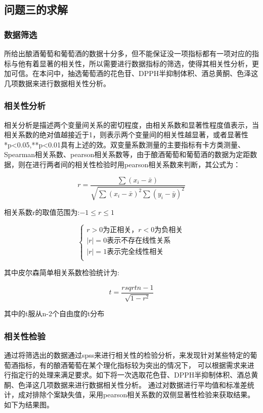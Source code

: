\documentclass[UTF8]{ctexart}
\begin{document}
\begin{itemize}
\end{itemize}


\subsection{问题三的求解}
\subsubsection{数据筛选}
所给出酿酒葡萄和葡萄酒的数据十分多，但不能保证没一项指标都有一项对应的指标与他有着显著的相关性，所以需要进行数据指标的筛选，使得其相关性分析，更加可信。在本问中，抽选葡萄酒的花色苷、DPPH半抑制体积、酒总黄酮、色泽这几项数据来进行数据相关性分析。

\subsubsection{相关性分析}

相关分析是描述两个变量间关系的密切程度，由相关系数和显著性程度值表示，当相关系数的绝对值越接近于1，则表示两个变量间的相关性越显著，或者显著性*p<0.05,**p<0.01具有上述的效。双变量系数测量的主要指标有卡方类测量、Spearman相关系数、pearson相关系数等，由于酿酒葡萄和葡萄酒的数据为定距数据，则在进行两者间的相关性检验时用pearson相关系数来判断，其公式为：

\begin{equation}
	r=\frac{\sum(x_i-\bar{x})}{\sqrt{\sum(x_i-\bar{x})^2 \sum(y_i-\bar{y})^2}}
\end{equation}

相关系数r的取值范围为:$-1\le r \le 1$

\[\left\{\begin{array}{llcl}
		r>0为正相关，r<0为负相关         \\

		\mid r \mid =0表示不存在线性关系 \\

		\mid r \mid =1表示完全线性相关   \\
	\end{array} \right.\]

其中皮尔森简单相关系数检验统计为:

\begin{equation}
	t=\frac{r sqrt{n-1}}{\sqrt{1-r^2}}
\end{equation}

其中的t服从n-2个自由度的t分布

\subsubsection{相关性检验}
通过将筛选出的数据通过spss来进行相关性的检验分析，来发现针对某些特定的葡萄酒指标，有的酿酒葡萄在某个理化指标较为突出的情况下，
可以根据需求来进行指定行的处理来满足要求。如下将一次选取花色苷、DPPH半抑制体积、酒总黄酮、色泽这几项数据来进行数据相关性分析。
通过对数据进行平均值和标准差统计，成对排除个案缺失值，采用pearson相关系数的双侧显著性检验来获取结果。如下为结果图。
\end{document}
